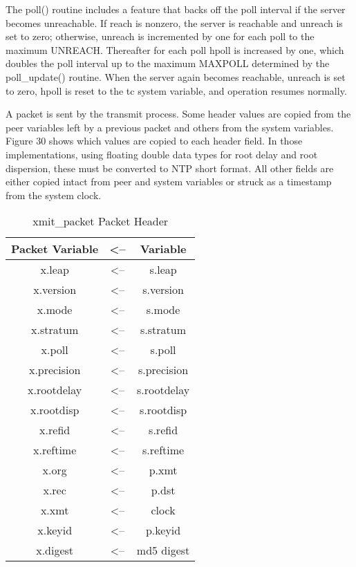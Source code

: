 The poll() routine includes a feature that backs off the poll
interval if the server becomes unreachable.  If reach is nonzero, the
server is reachable and unreach is set to zero; otherwise, unreach is
incremented by one for each poll to the maximum UNREACH.  Thereafter
for each poll hpoll is increased by one, which doubles the poll
interval up to the maximum MAXPOLL determined by the poll\_update()
routine.  When the server again becomes reachable, unreach is set to
zero, hpoll is reset to the tc system variable, and operation resumes
normally.

A packet is sent by the transmit process.  Some header values are
copied from the peer variables left by a previous packet and others
from the system variables.  Figure 30 shows which values are copied
to each header field.  In those implementations, using floating
double data types for root delay and root dispersion, these must be
converted to NTP short format.  All other fields are either copied
intact from peer and system variables or struck as a timestamp from
the system clock.

\begin{table}[htb]
\center
\begin{tabular}{c | c | c}
Packet Variable & <-- & Variable \\
\hline
\hline
x.leap      & <-- & s.leap      \\
x.version   & <-- & s.version   \\
x.mode      & <-- & s.mode      \\
x.stratum   & <-- & s.stratum   \\
x.poll      & <-- & s.poll      \\
x.precision & <-- & s.precision \\
x.rootdelay & <-- & s.rootdelay \\
x.rootdisp  & <-- & s.rootdisp  \\
x.refid     & <-- & s.refid     \\
x.reftime   & <-- & s.reftime   \\
x.org       & <-- & p.xmt       \\
x.rec       & <-- & p.dst       \\
x.xmt       & <-- & clock       \\
x.keyid     & <-- & p.keyid     \\
x.digest    & <-- & md5 digest  \\
\hline
\end{tabular}
\label{xmit_packet_packet_header}
\caption{xmit\_packet Packet Header}
\end{table}


